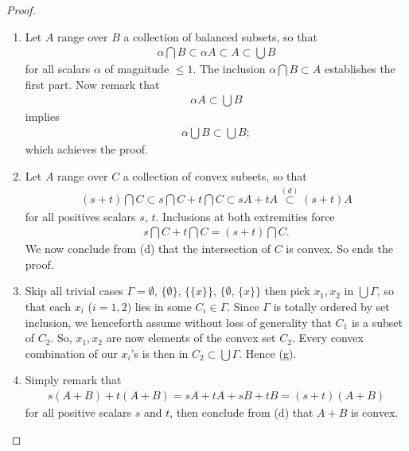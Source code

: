 \begin{proof}
\begin{enumerate}
\begin{align}
  0A + A \overset{(b)}{=}\{0\}+A=A.
\end{align}
%
The extension to $s=1$ is analogously established %
(or simply use the fact that $+$ is commutative!).
So ends the proof. %
\item Let $A$ range over $B$ a collection of balanced subsets, so that %
%
\begin{align}
  \alpha \bigcap B \subset  \alpha A \subset A \subset \bigcup B 
\end{align}
%
for all scalars $\alpha$ of magnitude $\leq 1$. %
The inclusion $\alpha \bigcap B \subset A$ establishes the first part. %
Now remark that %
%
\begin{align}
  \alpha A  \subset \bigcup {B} 
\end{align}
%
implies %
%
\begin{align}
  \alpha \bigcup {B} \subset \bigcup {B};
\end{align}
which achieves the proof. %
%
\item Let $A$ range over $C$ a collection of convex subsets, so that %
%
\begin{align}
  (s+t) \bigcap C \subset s\bigcap C + t\bigcap C \subset  sA + tA 
  \overset{(d)}{\subset} (s+t)A
\end{align}
%
for all positives scalars $\mathit{s}$, $\mathit{t}$. %
Inclusions at both extremities force %
%
\begin{align}
  s\bigcap C  + t\bigcap C = (s+t) \bigcap C.
\end{align}
%
We now conclude from (d) that the intersection of $C$ is convex. %
So ends the proof.
\item Skip all trivial cases %
%
  $\Gamma = \emptyset$, %
  $\{ \emptyset\}$, %
  $\{\{x\}\}$, %
  $\{\emptyset$, %
  $\{x\}\}$ %
%
then pick $x_1, x_2$ in $\bigcup \Gamma$, 
so that each $x_i$ ($i=1, 2)$ lies in some $C_i \in \Gamma$. %
%
Since $\Gamma$ is totally ordered by set inclusion, we henceforth assume %
without loss of generality that $C_1$ is a subset of $C_2$. %
%
So, $x_1, x_2$ are now elements of the convex set $C_2$. %
Every convex combination of our $x_i$'s is then in %
$C_2 \subset \bigcup \Gamma$. Hence (g). %
%
\item Simply remark that 
%
\begin{align}
  s (A+B) + t (A+B) = s A+ t A +s B +t B = (s+t)(A+B)
\end{align}
%
for all positive scalars $\mathit{s}$ and $\mathit{t}$, %
then conclude from (d) that $A + B$ is convex. %

\end{enumerate}
\end{proof}
